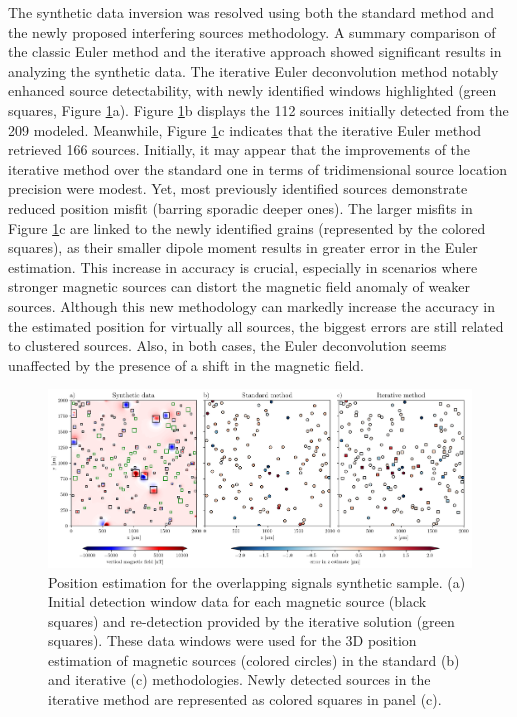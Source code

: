 The synthetic data inversion was resolved using both the standard method \citep{Souza-Junior2024} and the newly proposed interfering sources methodology. A summary comparison of the classic Euler method and the iterative approach showed significant results in analyzing the synthetic data. The iterative Euler deconvolution method notably enhanced source detectability, with newly identified windows highlighted (green squares, Figure \ref{euler2}a). Figure \ref{euler2}b displays the 112 sources initially detected from the 209 modeled. Meanwhile, Figure \ref{euler2}c indicates that the iterative Euler method retrieved 166 sources. Initially, it may appear that the improvements of the iterative method  over the standard one in terms of tridimensional source location precision were modest. Yet, most previously identified sources demonstrate reduced position misfit (barring sporadic deeper ones). The larger misfits in Figure \ref{euler2}c are linked to the newly identified grains (represented by the colored squares), as their smaller dipole moment results in greater error in the Euler estimation. This increase in accuracy is crucial, especially in scenarios where stronger magnetic sources can distort the magnetic field anomaly of weaker sources. Although this new methodology can markedly increase the accuracy in the estimated position for virtually all sources, the biggest errors are still related to clustered sources. Also, in both cases, the Euler deconvolution seems unaffected by the presence of a shift in the magnetic field.


\begin{figure}[tb!]
  \centering
  \includegraphics[width=1\linewidth]{paper/figures/euler-comparion-synthetic.png}
  \caption{
    Position estimation for the overlapping signals synthetic sample. (a) Initial detection window data for each magnetic source (black squares) and re-detection provided by the iterative solution (green squares). These data windows were used for the 3D position estimation of magnetic sources (colored circles) in the standard (b) and iterative (c) methodologies. Newly detected sources in the iterative method are represented as colored squares in panel (c).
  }
  \label{euler2}
\end{figure}

